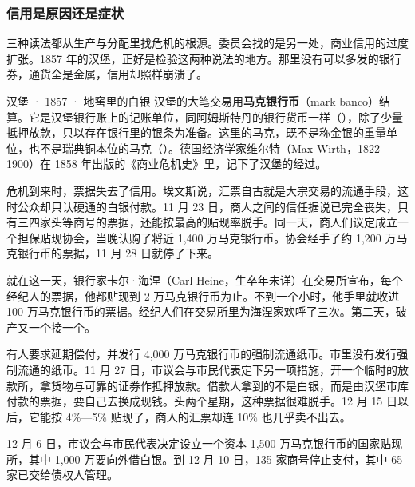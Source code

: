 \subsubsection{信用是原因还是症状}
三种读法都从生产与分配里找危机的根源。委员会找的是另一处，商业信用的过度扩张\cite{evans1859}。1857 年的汉堡，正好是检验这两种说法的地方。那里没有可以多发的银行券，通货全是金属，信用却照样崩溃了。

\begin{case}{汉堡 · 1857 · 地窖里的白银}
汉堡的大笔交易用\textbf{马克银行币}（mark banco）结算。它是汉堡银行账上的记账单位，同阿姆斯特丹的银行货币一样（），除了少量抵押放款，只以存在银行里的银条为准备\cite{wirth1858}。这里的马克，既不是称金银的重量单位，也不是瑞典铜本位的马克（）。德国经济学家维尔特（Max Wirth，1822—1900）在 1858 年出版的《商业危机史》里，记下了汉堡的经过\cite{wirth1858}。

危机到来时，票据失去了信用。埃文斯说，汇票自古就是大宗交易的流通手段，这时公众却只认硬通的白银付款\cite{evans1859}。11 月 23 日，商人之间的信任据说已完全丧失，只有三四家头等商号的票据，还能按最高的贴现率脱手\cite{evans1859}。同一天，商人们议定成立一个担保贴现协会，当晚认购了将近 1,400 万马克银行币\cite{wirth1858}。协会经手了约 1,200 万马克银行币的票据，11 月 28 日就停了下来\cite{wirth1858}。

就在这一天，银行家卡尔·海涅（Carl Heine，生卒年未详）在交易所宣布，每个经纪人的票据，他都贴现到 2 万马克银行币为止\cite{wirth1858}。不到一个小时，他手里就收进 100 万马克银行币的票据。经纪人们在交易所里为海涅家欢呼了三次\cite{wirth1858}。第二天，破产又一个接一个\cite{wirth1858}。

有人要求延期偿付，并发行 4,000 万马克银行币的强制流通纸币\cite{wirth1858}。市里没有发行强制流通的纸币。11 月 27 日，市议会与市民代表定下另一项措施，开一个临时的放款所，拿货物与可靠的证券作抵押放款\cite{wirth1858}。借款人拿到的不是白银，而是由汉堡市库付款的票据，要自己去换成现钱\cite{wirth1858}。头两个星期，这种票据很难脱手。12 月 15 日以后，它能按 4\%—5\% 贴现了，商人的汇票却连 10\% 也几乎卖不出去\cite{wirth1858}。

12 月 6 日，市议会与市民代表决定设立一个资本 1,500 万马克银行币的国家贴现所，其中 1,000 万要向外借白银\cite{wirth1858}。到 12 月 10 日，135 家商号停止支付，其中 65 家已交给债权人管理\cite{wirth1858}。


\end{case}
